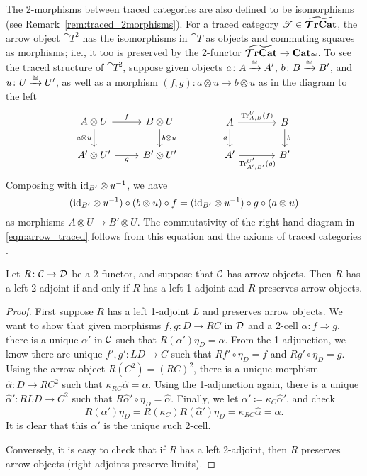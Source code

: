 \documentclass[11pt,oneside,article]{memoir}
\begin{document}
\begin{example}
The 2-morphisms between traced categories are also defined to be isomorphisms (see
Remark~\ref{rem:traced_2morphisms}). For a traced category $\mathscr{T}\in\widetilde{\bm{\mathcal{T}}\mathbf{rCat}}$, the arrow
object $\cat{T}^2$ has the isomorphisms in $\cat{T}$ as objects and commuting squares as morphisms;
i.e., it too is preserved by the 2-functor $\widetilde{\bm{\mathcal{T}}\mathbf{rCat}}\to\mathbf{Cat}_{\cong}$. To see the traced
structure of $\cat{T}^2$, suppose given objects $a\colon A\xrightarrow{\cong} A'$, $b\colon B\xrightarrow{\cong} B'$,
and $u\colon U\xrightarrow{\cong} U'$, as well as a morphism $(f,g)\colon a\otimes u\to b\otimes u$ as in the
diagram to the left
\begin{equation}
      \label{eqn:arrow_traced}
   \begin{tikzcd}
      A\otimes U\ar[d,"a\otimes u"']\ar[r,"f"]&B\otimes U\ar[d,"b\otimes u"]\\
      A'\otimes U'\ar[r,"g"']&B'\otimes U'
   \end{tikzcd}
   \qquad\qquad
   \begin{tikzcd}[column sep=large]
      A\ar[d,"a"']\ar[r,"\Tr^U_{A,B}(f)"]&B\ar[d,"b"]\\
      A'\ar[r,"\Tr^{U'}_{A',B'}(g)"']&B'
   \end{tikzcd}
\end{equation}
Composing with $\mathrm{id}_{B'}\otimes u^{-1}$, we have
\[
   (\mathrm{id}_{B'}\otimes u^{-1})\circ(b\otimes u)\circ f
      =(\mathrm{id}_{B'}\otimes u^{-1})\circ g\circ(a\otimes u)
\]
as morphisms $A\otimes U\to B'\otimes U$. The commutativity of the right-hand diagram in
\eqref{eqn:arrow_traced} follows from this equation and the axioms of traced categories
\cite{JoyalStreetVerity}.
\end{example}

\begin{lemma}
      \label{lem:2_adjunction}
   Let $R\colon\mathcal{C}\to\mathcal{D}$ be a 2-functor, and suppose that $\mathcal{C}$ has arrow objects.
   Then $R$ has a left 2-adjoint if and only if $R$ has a left 1-adjoint and $R$ preserves arrow
   objects.
\end{lemma}
\begin{proof}
   First suppose $R$ has a left 1-adjoint $L$ and preserves arrow objects. We want to show that
   given morphisms $f,g\colon D\to RC$ in $\mathcal{D}$ and a 2-cell $\alpha\colon f\Rightarrow g$,
   there is a unique $\alpha'$ in $\mathcal{C}$ such that $R(\alpha')\eta_D=\alpha$. From the
   1-adjunction, we know there are unique $f',g'\colon LD\to C$ such that $Rf'\circ\eta_D=f$ and
   $Rg'\circ\eta_D=g$. Using the arrow object $R(C^2)=(RC)^2$, there is a unique morphism
   $\hat{\alpha}\colon D\to RC^2$ such that $\kappa_{RC}\hat{\alpha}=\alpha$. Using the 1-adjunction
   again, there is a unique $\hat{\alpha}'\colon RLD\to C^2$ such that
   $R\hat{\alpha}'\circ\eta_D=\hat{\alpha}$. Finally, we let
   $\alpha'\coloneqq\kappa_C\hat{\alpha}'$, and check
   \[
      R(\alpha')\eta_D = R(\kappa_C)R(\hat{\alpha}')\eta_D = \kappa_{RC}\hat{\alpha} = \alpha.
   \]
   It is clear that this $\alpha'$ is the unique such 2-cell.

   Conversely, it is easy to check that if $R$ has a left 2-adjoint, then $R$ preserves arrow
   objects (right adjoints preserve limits).
\end{proof}
\end{document}
